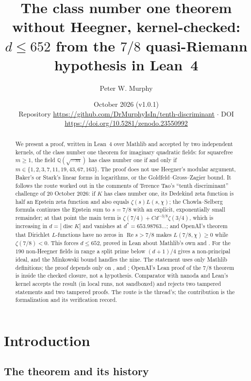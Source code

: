\documentclass[11pt]{article}
\title{The class number one theorem without Heegner, kernel-checked:\\
$d \le 652$ from the $7/8$ quasi-Riemann hypothesis in Lean~4}
\author{Peter W. Murphy}
\date{October 2026 (v1.0.1)\\[2pt] \small Repository \url{https://github.com/DrMurphyIsIn/tenth-discriminant} \;$\cdot$\; DOI \url{https://doi.org/10.5281/zenodo.23550992}}
\theoremstyle{definition}
\newcommand{\re}{\operatorname{Re}}
\newcommand{\Q}{\mathbb{Q}}
\newcommand{\disc}{\operatorname{disc}}
\begin{document}
\maketitle

\begin{abstract}
We present a proof, written in Lean~4 over Mathlib and accepted by two independent kernels, of the class number one theorem for imaginary quadratic fields: for squarefree $m \ge 1$, the field $\Q(\sqrt{-m})$ has class number one if and only if $m \in \{1, 2, 3, 7, 11, 19, 43, 67, 163\}$. The proof does not use Heegner's modular argument, Baker's or Stark's linear forms in logarithms, or the Goldfeld--Gross--Zagier bound. It follows the route worked out in the comments of Terence Tao's ``tenth discriminant'' challenge of 20 October 2026: if $K$ has class number one, its Dedekind zeta function is half an Epstein zeta function and also equals $\zeta(s)L(s,\chi)$; the Chowla--Selberg formula continues the Epstein sum to $s = 7/8$ with an explicit, exponentially small remainder; at that point the main term is $\zeta(7/4) + C d^{-3/8}\zeta(3/4)$, which is increasing in $d = |\disc K|$ and vanishes at $d^* = 653.98763\ldots$; and OpenAI's theorem that Dirichlet $L$-functions have no zeros in $\re s > 7/8$ makes $L(7/8,\chi) \ge 0$ while $\zeta(7/8) < 0$. This forces $d \le 652$, proved in Lean about Mathlib's own  and . For the $190$ non-Heegner fields in range a split prime below $(d+1)/4$ gives a non-principal ideal, and the Minkowski bound handles the nine. The statement uses only Mathlib definitions; the proof depends only on ,  and ; OpenAI's Lean proof of the $7/8$ theorem is inside the checked closure, not a hypothesis. Comparator with nanoda and Lean's kernel accepts the result (in local runs, not sandboxed) and rejects two tampered statements and two tampered proofs. The route is the thread's; the contribution is the formalization and its verification record.
\end{abstract}

\section{Introduction}

\subsection{The theorem and its history}
\end{document}
